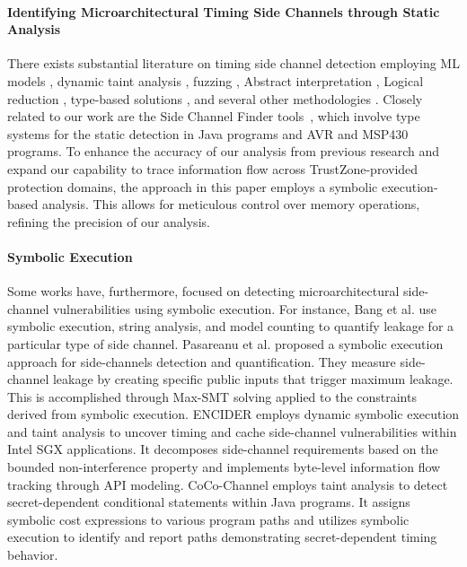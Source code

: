 \paragraph{\textbf{Identifying Microarchitectural Timing Side Channels
through Static Analysis}}
%
There exists substantial literature on timing side channel detection
employing ML models \cite{MLforSC, chiappetta2016realtime,
allaf2017comparison}, dynamic taint analysis \cite{graa2017detection},
fuzzing \cite{nilizadeh2018diffuzz}, Abstract interpretation
\cite{kopf2012automatic, doychev2015cacheaudit}, Logical reduction
\cite{chen2017precise}, type-based solutions \cite{MantelAVR, scfmsp,
barthe2014system, rodrigues2016sparse, zhang2012languagebased,
lux2011tool}, and several other methodologies \cite{timingattack,
akram2020sherlock, szefer2019survey}. Closely related to our work are the
Side Channel Finder tools~\cite{lux2011tool, MantelAVR, scfmsp}, which
involve type systems for the static detection in Java programs and AVR and
MSP430 programs. To enhance the accuracy of our analysis from previous
research and expand our capability to trace information flow across
TrustZone-provided protection domains, the approach in this paper employs a
symbolic execution-based analysis.  This allows for meticulous control over
memory operations, refining the precision of our analysis.

\paragraph{\textbf{Symbolic Execution}}
%
Some works \cite{binsec, pitchfork, sung2018canal,
chattopadhyay2018symbolic, brotzman2019casym, brennan2018symbolic,
yavuz2022encider, pasareanu2016multi, bang2016string} have, furthermore,
focused on detecting microarchitectural side-channel vulnerabilities using
symbolic execution. For instance, Bang et al. \cite{bang2016string} use
symbolic execution, string analysis, and model counting to quantify leakage
for a particular type of side channel. Pasareanu et al.
\cite{pasareanu2016multi} proposed a symbolic execution approach for
side-channels detection and quantification. They measure side-channel
leakage by creating specific public inputs that trigger maximum leakage.
This is accomplished through Max-SMT solving applied to the constraints
derived from symbolic execution. ENCIDER \cite{yavuz2022encider} employs
dynamic symbolic execution and taint analysis to uncover timing and cache
side-channel vulnerabilities within Intel SGX applications. It decomposes
side-channel requirements based on the bounded non-interference property
and implements byte-level information flow tracking through API modeling.
CoCo-Channel \cite{brennan2018symbolic} employs taint analysis to detect
secret-dependent conditional statements within Java programs. It assigns
symbolic cost expressions to various program paths and utilizes symbolic
execution to identify and report paths demonstrating secret-dependent
timing behavior.


